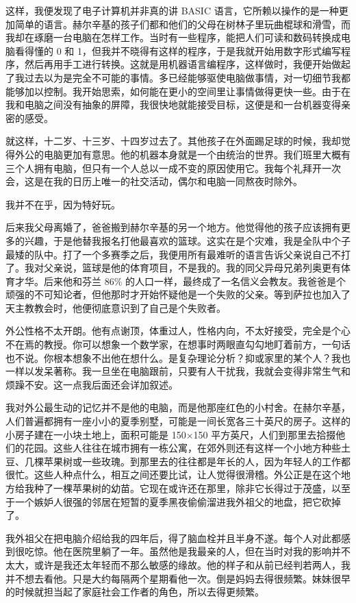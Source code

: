 这样，我便发现了电子计算机并非真的讲 BASIC 语言，它所赖以操作的是一种更加简单的语言。赫尔辛基的孩子们都和他们的父母在树林子里玩曲棍球和滑雪，而我却在琢磨一台电脑在怎样工作。当时有一些程序，能把人们可读和数码转换成电脑看得懂的 0 和 1，但我并不晓得有这样的程序，于是我就开始用数字形式编写程序，然后再用手工进行转换。这就是用机器语言编程序，这样做时，我便开始做起了我过去以为是完全不可能的事情。多已经能够驱使电脑做事情，对一切细节我都能够加以控制。我开始思索，如何能在更小的空间里让事情做得更快一些。由于在我和电脑之间没有抽象的屏障，我很快地就能接受目标，这便是和一台机器变得亲密的感受。

就这样，十二岁、十三岁、十四岁过去了。其他孩子在外面踢足球的时候，我却觉得外公的电脑更加有意思。他的机器本身就是一个由统治的世界。我们班里大概有三个人拥有电脑，但只有一个人总以一成不变的原因使用它。我每个礼拜开一次会，这是在我的日历上唯一的社交活动，偶尔和电脑一同熬夜时除外。

我并不在乎，因为特好玩。

后来我父母离婚了，爸爸搬到赫尔辛基的另一个地方。他觉得他的孩子应该拥有更多的兴趣，于是他替我报名打他最喜欢的篮球。这实在是个灾难，我是全队中个子最矮的队中。打了一个多赛季之后，我便用所有最难听的语言告诉父亲说自己不打了。我对父亲说，篮球是他的体育项目，不是我的。我的同父异母兄弟列奥更有体育才华。后来他和芬兰 86\% 的人口一样，最终成了一名信义会教友。我爸爸是个顽强的不可知论者，但他那时才开始怀疑他是一个失败的父亲。等到萨拉也加入了天主教教会时，他便彻底意识到了自己是个失败者。

外公性格不太开朗。他有点谢顶，体重过人，性格内向，不太好接受，完全是个心不在焉的教授。你可以想象一个数学家，在想事时两眼直勾勾地盯着前方，一句话也不说。你根本想象不出他在想什么。是复杂理论分析？抑或家里的某个人？我也一样以发呆著称。我一旦坐在电脑跟前，只要有人干扰我，我就会变得非常生气和烦躁不安。这一点我后面还会详加叙述。

我对外公最生动的记忆并不是他的电脑，而是他那座红色的小村舍。在赫尔辛基，人们普遍都拥有一座小小的夏季别墅，可能是一间长宽各三十英尺的房子。这样的小房子建在一小块土地上，面积可能是 150$\times$150 平方英尺，人们到那里去拾掇他们的花园。这些人往往在城市拥有一栋公寓，在郊外则还有这样一个小地方种些土豆、几棵苹果树或一些玫瑰。到那里去的往往都是年长的人，因为年轻人的工作都很忙。这些人种点什么，相互之间还要比试，让人觉得很滑稽。外公正是在这个地方给我种了一棵苹果树的幼苗。它现在或许还在那里，除非它长得过于茂盛，以至于一个嫉妒人很强的邻居在短暂的夏季黑夜偷偷溜进我外祖父的地盘，把它砍掉了。

我外祖父在把电脑介绍给我的四年后，得了脑血栓并且半身不遂。每个人对此都感到很吃惊。他在医院里躺了一年。虽然他是我最亲的人，但在当时对我的影响并不太大，或许是我还太年轻而不那么敏感的缘故。他的样子和从前已经判若两人，我并不想去看他。只是大约每隔两个星期看他一次。倒是妈妈去得很频繁。妹妹很早的时候就担当起了家庭社会工作者的角色，所以去得更频繁。


